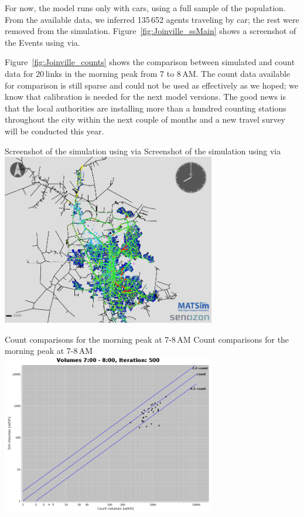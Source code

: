 For now, the model runs only with cars, using a full sample of the population. From the available data, we inferred 135\,652 agents traveling by car; the rest were removed from the simulation. Figure~\ref{fig:Joinville_ssMain} shows a screenshot of the Events using \gls{via}.

Figure~\ref{fig:Joinville_counts} shows the comparison between simulated and count data for 20\,links in the morning peak from 7 to 8\,AM. The count data available for comparison is still sparse and could not be used as effectively as we hoped; we know that calibration is needed for the next model versions. The good news is that the local authorities are installing more than a hundred counting stations throughout the city within the next couple of months and a new travel survey will be conducted this year. 

\createfigure%
{Screenshot of the simulation using \gls{via}}%
{Screenshot of the simulation using \gls{via}}%
{\label{fig:Joinville_ssMain}}%
{\includegraphics[width=0.7\textwidth, angle=0]{./scenarios/figures/Joinville_ssMain.png}}%
{}

\createfigure%
{Count comparisons for the morning peak at 7-8\,AM}%
{Count comparisons for the morning peak at 7-8\,AM}%
{\label{fig:Joinville_counts}}%
{\includegraphics[width=0.7\textwidth, angle=0]{./scenarios/figures/Joinville_LogManha.png}}%
{}


